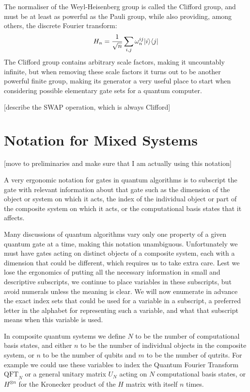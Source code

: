 The normaliser of the Weyl-Heisenberg group is called the Clifford group, and must be at least as powerful as the Pauli group, while also providing, among others, the discrete Fourier transform:
\[H_n = \frac{1}{\sqrt{n}}\sum_{i,j} \omega_n^{ij}| i \rangle\langle j |\]
The Clifford group contains arbitrary scale factors, making it uncountably infinite, but when removing these scale factors it turns out to be another powerful finite group, making its generator a very useful place to start when considering possible elementary gate sets for a quantum computer.

[describe the SWAP operation, which is always Clifford]


\section{Notation for Mixed Systems}
[move to preliminaries and make sure that I am actually using this notation]

A very ergonomic notation for gates in quantum algorithms is to subscript the gate with relevant information about that gate such as the dimension of the object or system on which it acts, the index of the individual object or part of the composite system on which it acts, or the computational basis states that it affects.

Many discussions of quantum algorithms vary only one property of a given quantum gate at a time, making this notation unambiguous. Unfortunately we must have gates acting on distinct objects of a composite system, each with a dimension that could be different, which requires us to take extra care. Lest we lose the ergonomics of putting all the necessary information in small and descriptive subscripts, we continue to place variables in these subscripts, but avoid numerals unless the meaning is clear. We will now enumerate in advance the exact index sets that could be used for a variable in a subscript, a preferred letter in the alphabet for representing such a variable, and what that subscript means when this variable is used.

In composite quantum systems we define $N$ to be the number of computational basis states, and either $n$ to be the number of individual objects in the composite system, or $n$ to be the number of qubits and $m$ to be the number of qutrits. For example we could use these variables to index the Quantum Fourier Transform $\text{QFT}_N$ or a general unitary matrix $U_N$ acting on $N$ computational basis states, or $H^{\otimes n}$ for the Kronecker product of the $H$ matrix with itself $n$ times.

